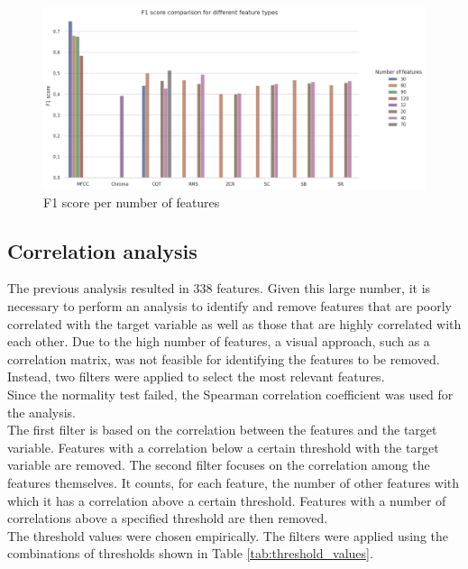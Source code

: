 \begin{figure}[htbp]
    \centering
    \includegraphics[width=.8\textwidth]{../images/n_feature_per_type.png}
    \caption{F1 score per number of features}
    \label{fig:n_feature_per_type}
\end{figure}
\noindent
\subsection{Correlation analysis}
The previous analysis resulted in 338 features. Given this large number, it is necessary to perform an analysis to identify and remove features
that are poorly correlated with the target variable as well as those that are highly correlated with each other.
Due to the high number of features, a visual approach, such as a correlation matrix, was not feasible for identifying the features to be removed.
Instead, two filters were applied to select the most relevant features.\\
Since the normality test failed, the Spearman correlation coefficient was used for the analysis.\\
The first filter is based on the correlation between the features and the target variable. Features with a correlation below a certain
threshold with the target variable are removed. The second filter focuses on the correlation among the features themselves.
It counts, for each feature, the number of other features with which it has a correlation above a certain threshold. Features with a
number of correlations above a specified threshold are then removed.\\
The threshold values were chosen empirically. The filters were applied using the combinations of thresholds shown in Table \ref{tab:threshold_values}.


